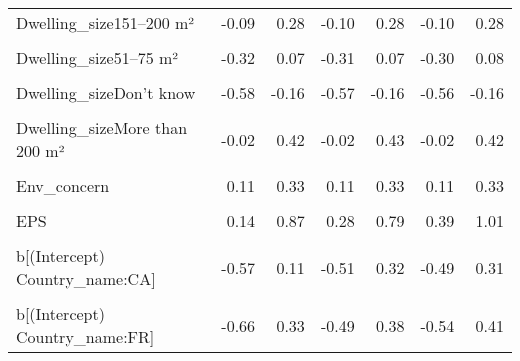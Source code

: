 \begin{table}
\begin{tabular}[t]{lrrrrrr}
Dwelling\_size151–200 m² & -0.09 & 0.28 & -0.10 & 0.28 & -0.10 & 0.28\\
\cellcolor{gray!10}{Dwelling\_size26–50 m²} & \cellcolor{gray!10}{-0.33} & \cellcolor{gray!10}{0.15} & \cellcolor{gray!10}{-0.34} & \cellcolor{gray!10}{0.15} & \cellcolor{gray!10}{-0.34} & \cellcolor{gray!10}{0.14}\\
Dwelling\_size51–75 m² & -0.32 & 0.07 & -0.31 & 0.07 & -0.30 & 0.08\\
\cellcolor{gray!10}{Dwelling\_size76–100 m²} & \cellcolor{gray!10}{-0.37} & \cellcolor{gray!10}{-0.03} & \cellcolor{gray!10}{-0.37} & \cellcolor{gray!10}{-0.03} & \cellcolor{gray!10}{-0.35} & \cellcolor{gray!10}{-0.02}\\
Dwelling\_sizeDon't know & -0.58 & -0.16 & -0.57 & -0.16 & -0.56 & -0.16\\
\cellcolor{gray!10}{Dwelling\_sizeLess than 25 m²} & \cellcolor{gray!10}{-0.90} & \cellcolor{gray!10}{0.05} & \cellcolor{gray!10}{-0.91} & \cellcolor{gray!10}{0.03} & \cellcolor{gray!10}{-0.92} & \cellcolor{gray!10}{0.03}\\
Dwelling\_sizeMore than 200 m² & -0.02 & 0.42 & -0.02 & 0.43 & -0.02 & 0.42\\
\cellcolor{gray!10}{Rural} & \cellcolor{gray!10}{-0.01} & \cellcolor{gray!10}{0.23} & \cellcolor{gray!10}{-0.01} & \cellcolor{gray!10}{0.22} & \cellcolor{gray!10}{-0.01} & \cellcolor{gray!10}{0.23}\\
Env\_concern & 0.11 & 0.33 & 0.11 & 0.33 & 0.11 & 0.33\\
\cellcolor{gray!10}{Gov\_support} & \cellcolor{gray!10}{7.03} & \cellcolor{gray!10}{17.94} & \cellcolor{gray!10}{6.97} & \cellcolor{gray!10}{17.19} & \cellcolor{gray!10}{7.10} & \cellcolor{gray!10}{17.53}\\
EPS & 0.14 & 0.87 & 0.28 & 0.79 & 0.39 & 1.01\\
\cellcolor{gray!10}{b[(Intercept) Country\_name:BE]} & \cellcolor{gray!10}{0.19} & \cellcolor{gray!10}{0.87} & \cellcolor{gray!10}{-0.27} & \cellcolor{gray!10}{0.65} & \cellcolor{gray!10}{-0.25} & \cellcolor{gray!10}{0.72}\\
b[(Intercept) Country\_name:CA] & -0.57 & 0.11 & -0.51 & 0.32 & -0.49 & 0.31\\
\cellcolor{gray!10}{b[(Intercept) Country\_name:CH]} & \cellcolor{gray!10}{-0.59} & \cellcolor{gray!10}{0.31} & \cellcolor{gray!10}{-0.48} & \cellcolor{gray!10}{0.35} & \cellcolor{gray!10}{-0.50} & \cellcolor{gray!10}{0.38}\\
b[(Intercept) Country\_name:FR] & -0.66 & 0.33 & -0.49 & 0.38 & -0.54 & 0.41\\

\end{tabular}
\end{table}
